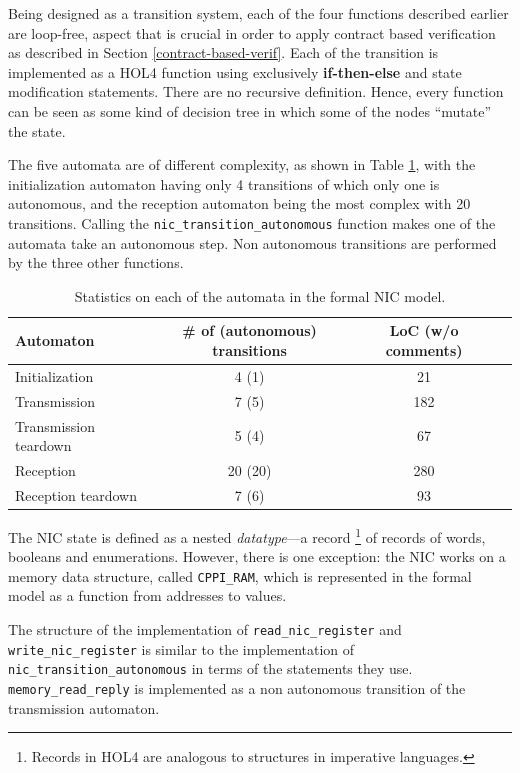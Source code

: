 \documentclass{kththesis}
\begin{document}
Being designed as a transition system, each of the four functions described earlier are loop-free, aspect that is crucial in order to apply contract based verification as described in Section \ref{contract-based-verif}. Each of the transition is implemented as a HOL4 function using exclusively \textbf{if-then-else} and state modification statements. There are no recursive definition. Hence, every function can be seen as some kind of decision tree in which some of the nodes ``mutate'' the state. %

The five automata are of different complexity, as shown in Table \ref{stats_complexity_formal_nic_model}, with the initialization automaton having only 4 transitions of which only one is autonomous, and the reception automaton being the most complex with 20 transitions. Calling the \texttt{nic\_transition\_autonomous} function makes one of the automata take an autonomous step. Non autonomous transitions are performed by the three other functions.

\begin{table}[ht!]
    \centering
    \begin{tabular}{ | l | c | c | c | }
        \hline
        Automaton & \# of (autonomous) transitions & LoC (w/o comments)\\
        \hline
        Initialization & 4 (1) & 21\\
        Transmission & 7 (5) & 182\\
        Transmission teardown & 5 (4) & 67\\
        Reception & 20 (20) & 280\\
        Reception teardown & 7 (6) & 93\\
        \hline
    \end{tabular}
    \caption{Statistics on each of the automata in the formal NIC model.}
    \label{stats_complexity_formal_nic_model}
\end{table}

The NIC state is defined as a nested \textit{datatype}---a record \footnote{Records in HOL4 are analogous to structures in imperative languages.} of records of words, booleans and enumerations. However, there is one exception: the NIC works on a memory data structure, called \texttt{CPPI\_RAM}, which is represented in the formal model as a function from addresses to values.

The structure of the implementation of \texttt{read\_nic\_register} and \texttt{write\_nic\_register} is similar to the implementation of \texttt{nic\_transition\_autonomous} in terms of the statements they use. \texttt{memory\_read\_reply} is implemented as a non autonomous transition of the transmission automaton.
\end{document}
